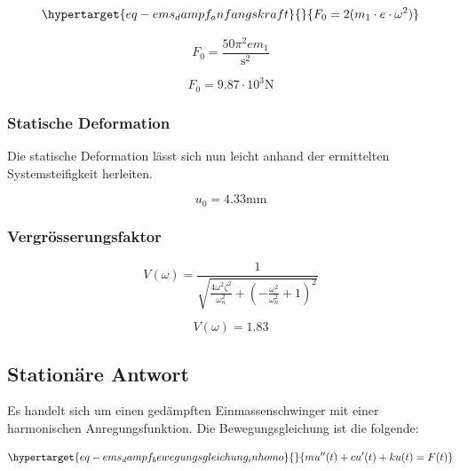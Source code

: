 \documentclass[
  letterpaper,
  DIV=11]{scrreprt}
\begin{document}
\begin{equation}\protect\hypertarget{eq-ems_dampf_anfangskraft}{}{
F_0 = 2(m_1 \cdot e \cdot \omega^2)
}\label{eq-ems_dampf_anfangskraft}\end{equation}

\begin{equation}F_{0} = \frac{50 \pi^{2} e m_{1}}{\text{s}^{2}}\end{equation}

\begin{equation}F_{0} = 9.87 \cdot 10^{3} \text{N}\end{equation}

\hypertarget{statische-deformation-1}{%
\subsubsection{Statische Deformation}\label{statische-deformation-1}}

Die statische Deformation lässt sich nun leicht anhand der ermittelten
Systemsteifigkeit herleiten.

\begin{equation}u_{0} = 4.33 \text{mm}\end{equation}

\hypertarget{vergruxf6sserungsfaktor-2}{%
\subsubsection{Vergrösserungsfaktor}\label{vergruxf6sserungsfaktor-2}}

\begin{equation}V{\left(\omega \right)} = \frac{1}{\sqrt{\frac{4 \omega^{2} \zeta_{}^{2}}{\omega_{n}^{2}} + \left(- \frac{\omega^{2}}{\omega_{n}^{2}} + 1\right)^{2}}}\end{equation}

\begin{equation}V{\left(\omega \right)} = 1.83\end{equation}

\hypertarget{stationuxe4re-antwort-1}{%
\subsection{Stationäre Antwort}\label{stationuxe4re-antwort-1}}

Es handelt sich um einen gedämpften Einmassenschwinger mit einer
harmonischen Anregungsfunktion. Die Bewegungsgleichung ist die folgende:

\begin{equation}\protect\hypertarget{eq-ems_dampf_bewegungsgleichung_inhomo}{}{
mu''(t)+ cu'(t) + ku(t) = F(t)
}\label{eq-ems_dampf_bewegungsgleichung_inhomo}\end{equation}
\end{document}
